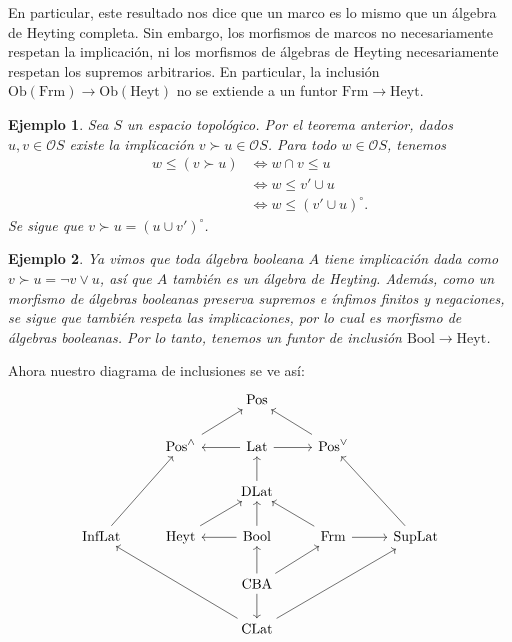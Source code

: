 \documentclass[12pt,letterpaper,titlepage]{article}
\newtheorem*{exa}{Ejemplo}
\theoremstyle{definition}
\renewcommand\sup{\vee}
\renewcommand\cal[1]{\mathcal{#1}}
\newcommand\<{\langle}
\renewcommand\>{\rangle}
\newcommand{\Frm}{\mathrm{Frm}}
\newcommand{\Pos}{\mathrm{Pos}}
\newcommand{\Lat}{\mathrm{Lat}}
\newcommand{\SupLat}{\mathrm{SupLat}}
\newcommand{\InfLat}{\mathrm{InfLat}}
\newcommand{\CLat}{\mathrm{CLat}}
\newcommand{\DLat}{\mathrm{DLat}}
\newcommand{\CBA}{\mathrm{CBA}}
\newcommand{\Heyt}{\mathrm{Heyt}}
\newcommand{\Bool}{\mathrm{Bool}}
\newcommand{\Ob}{\mathrm{Ob}}
\begin{document}
En particular, este resultado nos dice que un marco es lo mismo
que un álgebra de Heyting completa.
Sin embargo, los morfismos de marcos no necesariamente respetan
la implicación, ni los morfismos de álgebras de Heyting
necesariamente respetan los supremos arbitrarios.
En particular, la inclusión $\Ob(\Frm)\to\Ob(\Heyt)$
no se extiende a un funtor $\Frm\to\Heyt$.

\begin{exa}
  Sea $S$ un espacio topológico.
  Por el teorema anterior, dados $u,v\in\cal OS$
  existe la implicación $v\succ u\in \cal OS$.
  Para todo $w\in\cal OS$, tenemos
  \begin{align*}
    w\leq (v\succ u)
    &\iff w\cap v\leq u \\
    &\iff w\leq v'\cup u \\
    &\iff w\leq (v'\cup u)^\circ.
  \end{align*}
  Se sigue que $v\succ u = (u\cup v')^\circ$.
\end{exa}

\begin{exa}
  Ya vimos que toda álgebra booleana $A$ tiene implicación dada
  como $v\succ u = \neg v\sup u$, así que $A$ también
  es un álgebra de Heyting.
  Además, como un morfismo de álgebras booleanas preserva supremos
  e ínfimos finitos y negaciones, se sigue que
  también respeta las implicaciones, por lo cual es morfismo
  de álgebras booleanas.
  Por lo tanto, tenemos un funtor de inclusión $\Bool\to\Heyt$.
\end{exa}

Ahora nuestro diagrama de inclusiones se ve así:
\[
    \begin{tikzcd}
        &  & \Pos & & \\
        & \Pos^\wedge \arrow[ru]
        & \Lat \arrow[l] \arrow[r]
        & \Pos^\vee  \arrow[lu] & \\
        & & \DLat \arrow[u] & & \\
        \InfLat \arrow[ruu]
        & \Heyt \arrow[ur]
        & \Bool \arrow[l] \arrow[u]
        & \Frm \arrow[r] \arrow[lu]
        & \SupLat \arrow[luu] \\
        & & \CBA \arrow[d] \arrow[u] \arrow[ur] 
        & & \\
        & & \CLat \arrow[rruu]
        \arrow[lluu] & &
    \end{tikzcd}
\]
\end{document}
